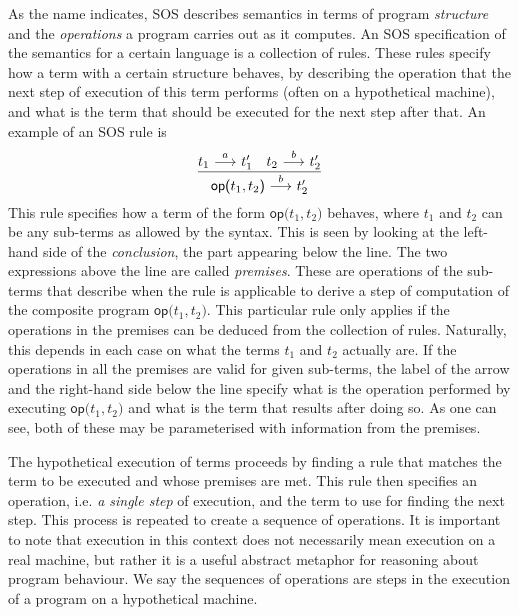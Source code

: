 As the name indicates, SOS describes semantics in terms of program \emph{structure}
and the \emph{operations} a program carries out as it computes. 
An SOS specification of the semantics for a certain
language is a collection of rules. These rules specify how a term with a certain
structure behaves, by describing the operation that the next step of execution
of this term performs
(often on a hypothetical machine), and what is the term that should be executed
for the next step after that. An example of an SOS rule is
\begin{equation}\label{eq:intro_rule1}
    \frac{t_1 \ {\stackrel{{a}}{\longrightarrow}}\  t_1' \quad t_2 \ {\stackrel{{b}}{\longrightarrow}}\  t_2'}{\textsf{op(}t_1,t_2\textsf{)}\ {\stackrel{{b}}{\longrightarrow}}\  t_2'}
\end{equation}
This rule specifies how a term of the form $\textsf{op(}t_1,t_2\textsf{)}$ behaves, where $t_1$
and $t_2$ can be any sub-terms as allowed by the syntax. This is seen by looking
at the left-hand side of the \emph{conclusion}, the part appearing below the line. 
The two expressions above
the line are called \emph{premises}. These are operations of the sub-terms
that describe when the rule is applicable to derive a step of computation
of the composite program $\textsf{op(}t_1,t_2\textsf{)}$.
This particular rule only applies if the operations in the premises can be
deduced from the collection of rules. Naturally, this depends in each case on what
the terms $t_1$ and $t_2$ actually are. If the operations in all the premises
are valid for given sub-terms, the label of the arrow and the right-hand side below the line
specify what is the operation performed by executing $\textsf{op(}t_1,t_2\textsf{)}$
and what is the term that results after doing so. As one can see, both of these may
be parameterised with information from the premises.

The hypothetical execution of terms proceeds by finding a rule that matches the
term to be executed and whose premises are met. This rule then specifies an operation,
i.e. \emph{a single step} of execution, and the term to use for finding the
next step. This process is repeated to create a sequence of operations.
It is important to note that execution in this context does not necessarily mean
execution on a real machine, but rather it is a useful abstract metaphor for reasoning about
program behaviour. We say the sequences of operations are steps in the execution
of a program on a hypothetical machine.

